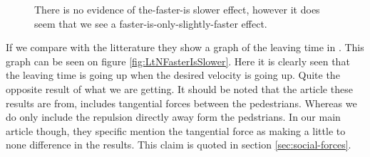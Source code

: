 \begin{figure}[h]
    \caption{There is no evidence of the-faster-is slower effect, however it does 
    seem that we see a faster-is-only-slightly-faster effect.}
    \label{fig:isfasterslower}
\end{figure}
If we compare with the litterature they show a graph of the leaving time in 
\cite{helbing00}. This graph can be seen on figure 
\ref{fig:LtNFasterIsSlower}. Here it is clearly seen that the leaving time is 
going up when the desired velocity is going up. Quite the opposite result of 
what we are getting. It should be noted that the article these results are 
from, includes tangential forces between the pedestrians. Whereas we do only 
include the repulsion directly away form the pedstrians. In our main article 
\cite{self-org} though, they specific mention the tangential force as making a 
little to none difference in the results. This claim is quoted in section 
\ref{sec:social-forces}.
